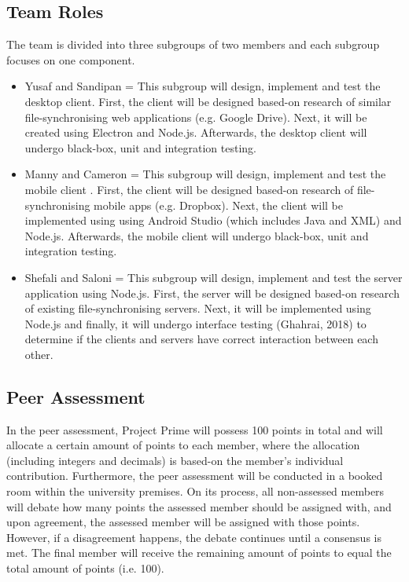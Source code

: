 \documentclass{article}
\begin{document}
	\subsection{Team Roles}
	The team is divided into three subgroups of two members and each subgroup focuses on one component.
	\begin{itemize}
	\item Yusaf and Sandipan = This subgroup will design, implement and test the desktop client. First, the client will be designed based-on research of similar file-synchronising web applications (e.g. Google Drive). Next, it will be created using Electron and Node.js. Afterwards, the desktop client will undergo black-box, unit and integration testing. 
	\item Manny and Cameron = This subgroup will  design, implement and test the mobile client . First, the client will be designed based-on research of file-synchronising mobile apps (e.g. Dropbox). Next, the client will be implemented using using Android Studio (which includes Java and XML) and Node.js.  Afterwards, the mobile client will undergo black-box, unit and integration testing.
	\item Shefali and Saloni = This subgroup will design, implement and test the server application using Node.js. First, the server will be designed based-on research of existing file-synchronising servers. Next, it will be implemented using Node.js and finally, it will undergo interface testing (Ghahrai, 2018) to determine if the clients and servers have correct interaction between each other.
	\end{itemize}

	\subsection{Peer Assessment}
	In the peer assessment, Project Prime will possess 100 points in total and will allocate a certain amount of points to each member, where the allocation (including integers and decimals) is based-on the member's individual contribution. Furthermore, the peer assessment will be conducted in a booked room within the university premises. On its process, all non-assessed members will debate how many points the assessed member should be assigned  with, and upon agreement, the assessed member will be assigned with those points. However, if a disagreement happens, the debate continues until a consensus is met. The final member will receive the remaining amount of points to equal the total amount of points (i.e. 100).
\end{document}
